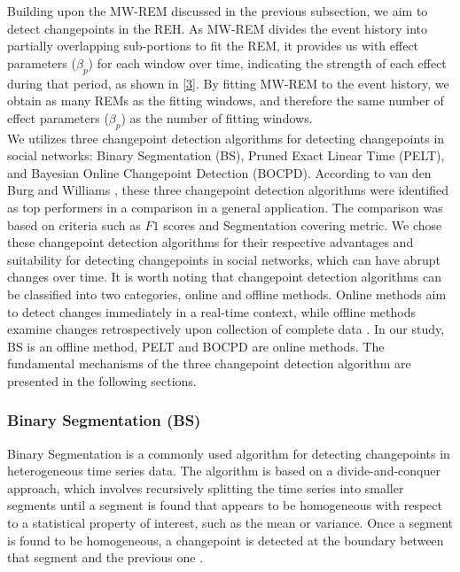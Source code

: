 \documentclass[]{interact}
\theoremstyle{plain}%
\theoremstyle{definition}
\theoremstyle{remark}
\begin{document}
	\hspace{0.2cm} Building upon the MW-REM discussed in the previous subsection, we aim to detect changepoints in the REH. As MW-REM divides the event history into partially overlapping sub-portions to fit the REM, it provides us with effect parameters ($\beta_p$) for each window over time, indicating the strength of each effect during that period, as shown in \autoref{3}. By fitting MW-REM to the event history, we obtain as many REMs as the fitting windows, and therefore the same number of effect parameters ($\beta_p$) as the number of fitting windows. \\
	
	We utilizes three changepoint detection algorithms for detecting changepoints in social networks: Binary Segmentation (BS), Pruned Exact Linear Time (PELT), and Bayesian Online Changepoint Detection (BOCPD). According to van den Burg and Williams \cite{burgEvaluationChangePoint2022}, these three changepoint detection algorithms were identified as top performers in a comparison in a general application. The comparison was based on criteria such as $F1$ scores and Segmentation covering metric. We chose these changepoint detection algorithms for their respective advantages and suitability for detecting changepoints in social networks, which can have abrupt changes over time. It is worth noting that changepoint detection algorithms can be classified into two categories, online and offline methods. Online methods aim to detect changes immediately in a real-time context, while offline methods examine changes retrospectively upon collection of complete data \cite{kendrickChangePointDetection2018}. In our study, BS is an offline method, PELT and BOCPD are online methods. The fundamental mechanisms of the three changepoint detection algorithm are presented in the following sections.
	
	\subsubsection{Binary Segmentation (BS)} \label{sec:BS}
	
	
	\hspace{0.28cm} Binary Segmentation is a commonly used algorithm for detecting changepoints in heterogeneous time series data. The algorithm is based on a divide-and-conquer approach, which involves recursively splitting the time series into smaller segments until a segment is found that appears to be homogeneous with respect to a statistical property of interest, such as the mean or variance. Once a segment is found to be homogeneous, a changepoint is detected at the boundary between that segment and the previous one \cite{killickOptimalDetectionChangepoints2012}. \\
	
\end{document}
